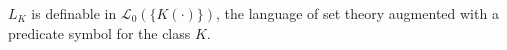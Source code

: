 $L_K$ is definable in $\mathcal{L}_0(\{K(\cdot)\})$, the language of set theory augmented with a predicate symbol for the class $K$.
